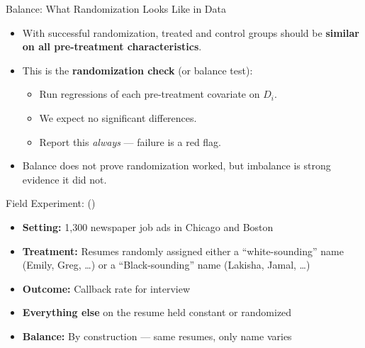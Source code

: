 \documentclass[aspectratio=169, 11pt]{beamer}
\begin{document}
\begin{frame}[t]{Balance: What Randomization Looks Like in Data}
\begin{itemize}
  \setlength\itemsep{0.5em}
  \item With successful randomization, treated and control groups should be
        \textbf{similar on all pre-treatment characteristics}.
  \item This is the \textbf{randomization check} (or balance test):
    \begin{itemize}
      \item Run regressions of each pre-treatment covariate on $D_i$.
      \item We expect no significant differences.
      \item Report this \emph{always} — failure is a red flag.
    \end{itemize}
  \item Balance does not prove randomization worked, but imbalance is strong evidence it did not.
\end{itemize}
\vspace{0.3em}
\end{frame}

\begin{frame}[t]{Field Experiment: \citeauthor{Bertrand2004_emily} (\citeyear{Bertrand2004_emily})}
\begin{examplebox}
  \small
  \begin{itemize}
    \item \textbf{Setting:} 1,300 newspaper job ads in Chicago and Boston
    \item \textbf{Treatment:} Resumes randomly assigned either a ``white-sounding''
          name (Emily, Greg, \ldots) or a ``Black-sounding'' name
          (Lakisha, Jamal, \ldots)
    \item \textbf{Outcome:} Callback rate for interview
    \item \textbf{Everything else} on the resume held constant or randomized
    \item \textbf{Balance:} By construction — same resumes, only name varies
  \end{itemize}
\end{examplebox}
\end{frame}
\end{document}
